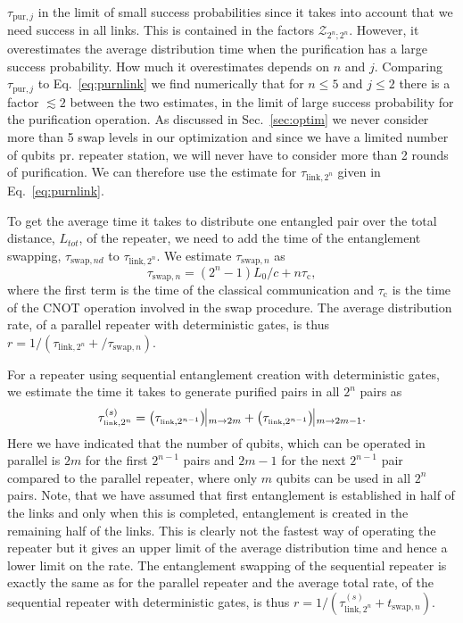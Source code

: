 $\tau_{\text{pur},j}$ in the limit of small success probabilities since it takes
into account that we need success in all links. This is contained in the factors
$\mathcal{Z}_{2^{n};2^{n}}$. However, it overestimates the average distribution
time when the purification has a large success probability. How much it
overestimates depends on $n$ and $j$. Comparing  $\tau_{\text{pur},j}$ to
Eq.~\eqref{eq:purnlink} we find numerically that for $n\leq5$ and $j\leq2$ there
is a factor $\lesssim2$ between the two estimates, in the limit of large success
probability for the purification operation. As discussed in Sec.~\ref{sec:optim}
we never consider more than 5 swap levels in our optimization and since we have
a limited number of qubits pr. repeater station, we will never have to consider
more than 2 rounds of purification. We can therefore use the estimate for
$\tau_{\text{link},2^{n}}$ given in Eq.~\eqref{eq:purnlink}.

To get the average time it takes to distribute one entangled pair over the total
distance, $L_{tot}$, of the repeater, we need to add the time of the
entanglement swapping, $\tau_{\text{swap},nd}$ to $\tau_{\text{link},2^{n}}$. We
estimate $\tau_{\text{swap},n}$ as
\begin{equation}
\tau_{\text{swap},n}=(2^{n}-1)L_{0}/c+n\tau_{\text{c}},
\end{equation} 
where the first term is the time of the classical communication and
$\tau_{\text{c}}$ is the time of the CNOT operation involved in the swap
procedure. The average distribution rate, of a parallel repeater with
deterministic gates, is thus
$r=1/(\tau_{\text{link},2^{n}}+/\tau_{\text{swap},n})$.

For a repeater using sequential entanglement creation with deterministic gates,
we estimate the time it takes to generate purified pairs in all $2^{n}$ pairs as
\begin{equation}
\tau^{(s)}_{\text{link},2^{n}}=\left(\tau_{\text{link},2^{n-1}}\right)\vline_{m\to2m}+\left(\tau_{\text{link},2^{n-1}}\right)\vline_{m\to2m-1}.
\end{equation}
Here we have indicated that the number of qubits, which can be operated in
parallel is $2m$ for the first $2^{n-1}$ pairs and $2m-1$ for the next $2^{n-1}$
pair compared to the parallel repeater, where only $m$ qubits can be used in all
$2^{n}$ pairs. Note, that we have assumed that first entanglement is established
in half of the links and only when this is completed, entanglement is created in
the remaining half of the links. This is clearly not the fastest way of
operating the repeater but it gives an upper limit of the average distribution
time and hence a lower limit on the rate. The entanglement swapping of the
sequential repeater is exactly the same as for the parallel repeater and the
average total rate, of the sequential repeater with deterministic gates, is thus
$r=1/(\tau^{(s)}_{\text{link},2^{n}}+t_{\text{swap},n})$.

